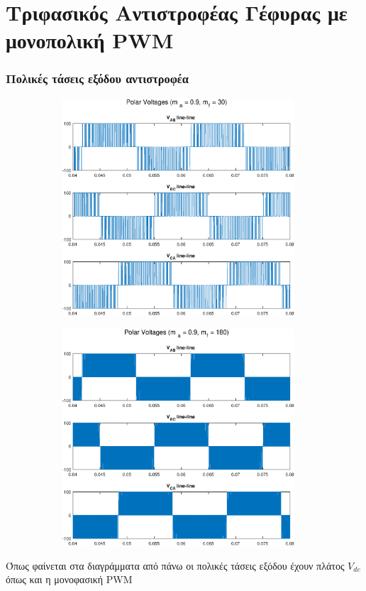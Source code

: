 \section{Τριφασικός Αντιστροφέας Γέφυρας με μονοπολική PWM}
\subsubsection*{Πολικές τάσεις εξόδου αντιστροφέα}
\begin{figure}[h!]
	\begin{subfigure}{0.49\textwidth}
		\centering
		\includegraphics[width=0.95\textwidth]{Images/4_Polar_voltages_30.eps}
	\end{subfigure}
	\begin{subfigure}{0.49\textwidth}
		\centering
		\includegraphics[width=0.95\textwidth]{Images/4_Polar_voltages_180.eps}
	\end{subfigure}
\end{figure}
\noindent
Όπως φαίνεται στα διαγράμματα από πάνω οι πολικές τάσεις εξόδου έχουν πλάτος $V_{dc}$ όπως και η μονοφασική PWM 


